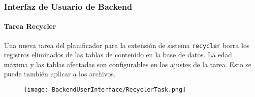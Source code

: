 \begin{frame}[fragile]
	\frametitle{Interfaz de Usuario de Backend}
	\framesubtitle{Tarea Recycler}

	Una nueva tarea del planificador para la extensión de sistema \texttt{recycler}
	borra los registros eliminados de las tablas de contenido en la base de
	datos. La edad máxima y las tablas afectadas son configurables en los ajustes
	de la tarea. Esto se puede también aplicar a los archivos.

	\begin{figure}
		\texttt{[image: BackendUserInterface/RecyclerTask.png]}
	\end{figure}

\end{frame}

